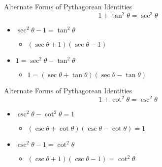 \documentclass[t,usenames,dvipsnames]{beamer}
\begin{document}
\begin{frame}{Alternate Forms of Pythagorean Identities}
    \[
    1 + \tan^2\theta = \sec^2\theta
    \]
    \pause
    \begin{itemize}
        \item $\sec^2\theta - 1 = \tan^2\theta$ \newline\\  \pause
        \begin{itemize}
            \item $(\sec\theta + 1)(\sec\theta - 1)$ \newline\\  \pause
        \end{itemize}
        \item $1 = \sec^2\theta - \tan^2\theta$ \newline\\  \pause
        \begin{itemize}
            \item $1 = (\sec\theta + \tan\theta)(\sec\theta - \tan\theta)$
        \end{itemize}
    \end{itemize}
\end{frame}

\begin{frame}{Alternate Forms of Pythagorean Identities}
    \[
    1 + \cot^2\theta = \csc^2\theta
    \]
    \pause
    \begin{itemize}
        \item $\csc^2\theta - \cot^2\theta = 1$ \newline\\  \pause
        \begin{itemize}
            \item $(\csc\theta + \cot\theta)(\csc\theta - \cot\theta) = 1$ \newline\\  \pause
        \end{itemize}
        \item $\csc^2 \theta - 1 = \cot^2\theta$ \newline\\  \pause
        \begin{itemize}
            \item $(\csc\theta + 1)(\csc\theta - 1) = \cot^2\theta$
        \end{itemize}
    \end{itemize}
\end{frame}
\end{document}
